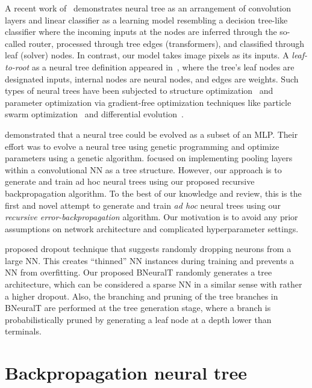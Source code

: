 \documentclass[11pt,a4paper]{article}
\begin{document}
    A recent work of~\cite{tanno2019adaptive} demonstrates neural tree as an arrangement of convolution layers and linear classifier as a learning model resembling a decision tree-like classifier where the incoming inputs at the nodes are inferred through the so-called router, processed through tree edges (transformers), and classified through leaf (solver) nodes. In contrast, our model takes image pixels as its inputs.
A \textit{leaf-to-root} as a neural tree definition appeared in~\citep{zhang1997evolutionary,chen2005time}, where the tree's leaf nodes are designated inputs, internal nodes are neural nodes, and edges are weights. Such types of neural trees have been subjected to structure optimization~\citep{chen2005time,ojha2017ensemble} and parameter optimization via gradient-free optimization techniques like particle swarm optimization~\citep{chen2007flexible} and differential evolution~\citep{ojha2017ensemble}. 
    
    \cite{zhang1997evolutionary} demonstrated that a neural tree could be evolved as a subset of an MLP. Their effort was to evolve a neural tree using genetic programming and optimize parameters using a genetic algorithm. \cite{lee2016generalizing} focused on implementing pooling layers within a convolutional NN as a tree structure. However, our approach is to generate and train ad hoc neural trees using  our proposed recursive backpropagation algorithm. To the best of our knowledge and review, this is the first and novel attempt to generate and train \textit{ad hoc} neural trees using our \textit{recursive error-backpropagation} algorithm. Our motivation is to avoid any prior assumptions on network architecture and complicated hyperparameter settings.
    
    \cite{srivastava14aJMLR} proposed dropout technique that suggests randomly dropping neurons from a large NN. This creates ``thinned'' NN instances during training and prevents a NN from overfitting. Our proposed BNeuralT randomly generates a tree architecture, which can be considered a sparse NN in a similar sense with rather a higher dropout. Also, the branching and pruning of the tree branches in BNeuralT are performed at the tree generation stage, where a branch is probabilistically  pruned by generating a leaf node at a depth lower than terminals.
    
    
    
    
    \section{Backpropagation neural tree}
    \label{sec:bpnt}
\end{document}
